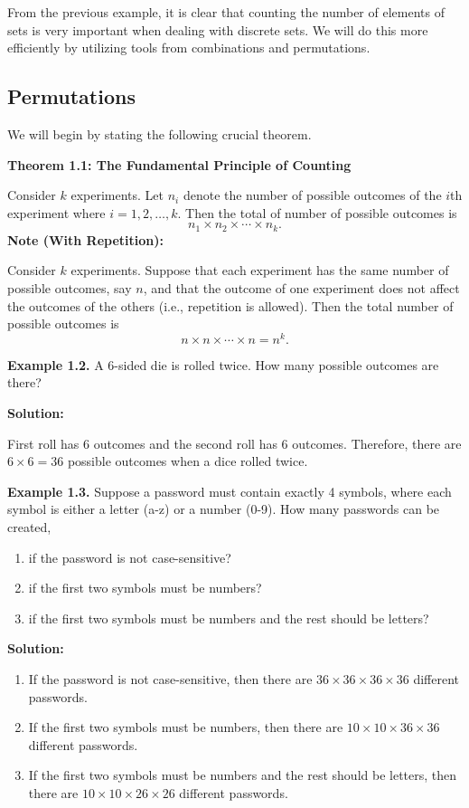 \documentclass[
  12pt,
]{krantzNoCorner}
\providecommand{\tightlist}{%
  \setlength{\itemsep}{0pt}\setlength{\parskip}{0pt}}
\begin{document}
From the previous example, it is clear that counting the number of
elements of sets is very important when dealing with discrete sets. We
will do this more efficiently by utilizing tools from combinations and
permutations.

\hypertarget{permutations}{%
\subsection{Permutations}\label{permutations}}

We will begin by stating the following crucial theorem.

\textbf{Theorem 1.1: The Fundamental Principle of Counting}

Consider \(k\) experiments. Let \(n_i\) denote the number of possible
outcomes of the \(i\)th experiment where \(i=1,2,\dots,k.\) Then the total
of number of possible outcomes is
\[n_1\times n_2\times\cdots\times n_k.\]
\textbf{Note (With Repetition):}

Consider \(k\) experiments. Suppose that each experiment has the same number of possible outcomes, say \(n\), and that the outcome of one experiment does not affect the outcomes of the others (i.e., repetition is allowed). Then the total number of possible outcomes is
\[
n \times n \times \cdots \times n = n^k.
\]

\textbf{Example 1.2.} A 6-sided die is rolled twice. How many possible
outcomes are there?

\textbf{Solution:}

First roll has 6 outcomes and the second roll has 6 outcomes. Therefore,
there are \(6\times 6 = 36\) possible outcomes when a dice rolled twice.

\textbf{Example 1.3.} Suppose a password must contain exactly 4 symbols,
where each symbol is either a letter (a-z) or a number (0-9). How many
passwords can be created,

\begin{enumerate}
\def\labelenumi{\arabic{enumi}.}
\tightlist
\item
  if the password is not case-sensitive?
\item
  if the first two symbols must be numbers?
\item
  if the first two symbols must be numbers and the rest should be
  letters?
\end{enumerate}

\textbf{Solution:}

\begin{enumerate}
\def\labelenumi{\arabic{enumi}.}
\tightlist
\item
  If the password is not case-sensitive, then there are
  \(36\times36\times36\times36\) different passwords.
\item
  If the first two symbols must be numbers, then there are
  \(10\times10\times36\times36\) different passwords.
\item
  If the first two symbols must be numbers and the rest should be
  letters, then there are \(10\times10\times26\times26\) different
  passwords.
\end{enumerate}
\end{document}
